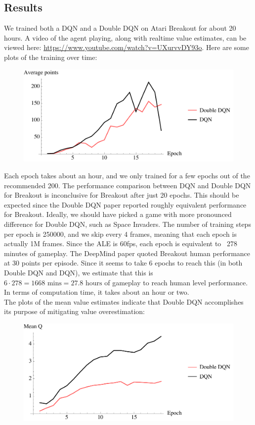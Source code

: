\documentclass{article}
\begin{document}
\subsection{Results}
We trained both a DQN and a Double DQN on Atari Breakout for about 20 hours. A video of the agent playing, along with realtime value estimates, can be viewed here: \href{https://www.youtube.com/watch?v=UXurvvDY93o}{https://www.youtube.com/watch?v=UXurvvDY93o}. Here are some plots of the training over time:
  \begin{figure}[H]
    \centering
    \includegraphics[width=120mm]{dqn_rewardper.pdf}
  \end{figure}
  Each epoch takes about an hour, and we only trained for a few epochs out of the recommended 200. The performance comparison between DQN and Double DQN for Breakout is inconclusive for Breakout after just 20 epochs. This should be expected since the Double DQN paper reported roughly equivalent performance for Breakout. Ideally, we should have picked a game with more pronounced difference for Double DQN, such as Space Invaders. The number of training steps per epoch is 250000, and we skip every 4 frames, meaning that each epoch is actually 1M frames. Since the ALE is 60fps, each epoch is equivalent to ~278 minutes of gameplay. The DeepMind paper quoted Breakout human performance at 30 points per episode. Since it seems to take 6 epochs to reach this (in both Double DQN and DQN), we estimate that this is $6 \cdot 278 = 1668 \mbox{ mins} = 27.8 \mbox{ hours}$ of gameplay to reach human level performance. In terms of computation time, it takes about an hour or two. \\

  The plots of the mean value estimates indicate that Double DQN accomplishes its purpose of mitigating value overestimation:
  \begin{figure}[H]
    \centering
    \includegraphics[width=120mm]{dqn_meanq.pdf}
  \end{figure}
\end{document}
